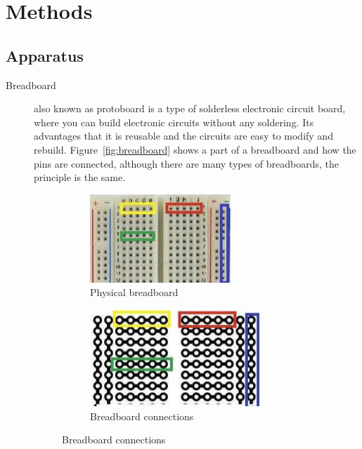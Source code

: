 \documentclass[a4paper, 10pt]{article}
\newcommand{\figref}[1]{Figure~\ref{#1}}
\begin{document}
	\pagebreak
	\section{Methods}
		\subsection{Apparatus}
			\begin{description}
				\item[Breadboard]
					also known as protoboard is a type of solderless electronic circuit board, where you can build electronic circuits without any soldering.
					Its advantages that it is reusable and the circuits are easy to modify and rebuild. \figref{fig:breadboard} shows a part of a breadboard and how the pins are connected,
					although there are many types of breadboards, the principle is the same.

					\begin{figure}[h!]
						\centering
						\begin{subfigure}[h]{0.45\textwidth}
							\includegraphics[width=\textwidth]{./images/Breadboard.png}
							\caption{Physical breadboard}
							\label{sub-fig:physical-breadboard}
						\end{subfigure}
						\hspace{0.5cm} %
						\begin{subfigure}[h]{0.45\textwidth}
							\includegraphics[width=\textwidth]{./images/Breadboard-Connections.png}
							\caption{Breadboard connections}
							\label{sub-fig:breadboard-connections}
						\end{subfigure}


\end{figure}
\end{description}
\end{document}
